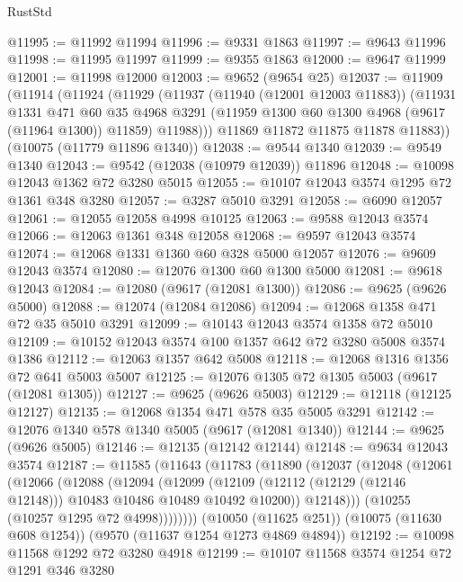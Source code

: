 \begin{lexlean}{RustStd}
\begin{coremodule}
@11995 := @11992 @11994
@11996 := @9331 @1863
@11997 := @9643 @11996
@11998 := @11995 @11997
@11999 := @9355 @1863
@12000 := @9647 @11999
@12001 := @11998 @12000
@12003 := @9652 (@9654 @25)
@12037 := @11909
    (@11914
      (@11924
        (@11929
          (@11937
            (@11940 (@12001 @12003 @11883))
            (@11931
              @1331
              @471
              @60
              @35
              @4968
              @3291
              (@11959 @1300 @60 @1300 @4968 (@9617 (@11964 @1300)) @11859)
              @11988)))
        @11869
        @11872
        @11875
        @11878
        @11883))
    (@10075 (@11779 @11896 @1340))
@12038 := @9544 @1340
@12039 := @9549 @1340
@12043 := @9542 (@12038 (@10979 @12039)) @11896
@12048 := @10098 @12043 @1362 @72 @3280 @5015
@12055 := @10107 @12043 @3574 @1295 @72 @1361 @348 @3280
@12057 := @3287 @5010 @3291
@12058 := @6090 @12057
@12061 := @12055 @12058 @4998 @10125
@12063 := @9588 @12043 @3574
@12066 := @12063 @1361 @348 @12058
@12068 := @9597 @12043 @3574
@12074 := @12068 @1331 @1360 @60 @328 @5000 @12057
@12076 := @9609 @12043 @3574
@12080 := @12076 @1300 @60 @1300 @5000
@12081 := @9618 @12043
@12084 := @12080 (@9617 (@12081 @1300))
@12086 := @9625 (@9626 @5000)
@12088 := @12074 (@12084 @12086)
@12094 := @12068 @1358 @471 @72 @35 @5010 @3291
@12099 := @10143 @12043 @3574 @1358 @72 @5010
@12109 := @10152 @12043 @3574 @100 @1357 @642 @72 @3280 @5008 @3574 @1386
@12112 := @12063 @1357 @642 @5008
@12118 := @12068 @1316 @1356 @72 @641 @5003 @5007
@12125 := @12076 @1305 @72 @1305 @5003 (@9617 (@12081 @1305))
@12127 := @9625 (@9626 @5003)
@12129 := @12118 (@12125 @12127)
@12135 := @12068 @1354 @471 @578 @35 @5005 @3291
@12142 := @12076 @1340 @578 @1340 @5005 (@9617 (@12081 @1340))
@12144 := @9625 (@9626 @5005)
@12146 := @12135 (@12142 @12144)
@12148 := @9634 @12043 @3574
@12187 := @11585
    (@11643
      (@11783
        (@11890
          (@12037
            (@12048
              (@12061
                (@12066
                  (@12088
                    (@12094
                      (@12099
                        (@12109
                          (@12112 (@12129 (@12146 @12148)))
                          @10483
                          @10486
                          @10489
                          @10492
                          @10200))
                      @12148)))
                (@10255 (@10257 @1295 @72 @4998))))))))
    (@10050 (@11625 @251))
    (@10075 (@11630 @608 @1254))
    (@9570 (@11637 @1254 @1273 @4869 @4894))
@12192 := @10098 @11568 @1292 @72 @3280 @4918
@12199 := @10107 @11568 @3574 @1254 @72 @1291 @346 @3280

\end{coremodule}
\end{lexlean}

